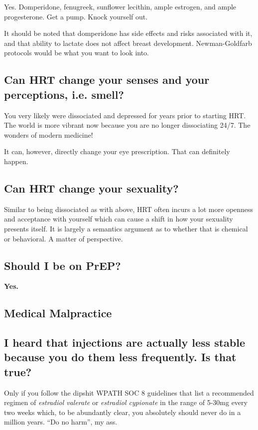 \documentclass{article}
\begin{document}
Yes. Domperidone, fenugreek, sunflower lecithin, ample estrogen, and ample progesterone. Get a pump. Knock yourself out.

It should be noted that domperidone has side effects and risks associated with it, and that ability to lactate does not affect breast development. Newman-Goldfarb protocols would be what you want to look into.

\subsection{Can HRT change your senses and your perceptions, i.e. smell?}

You very likely were dissociated and depressed for years prior to starting HRT. The world is more vibrant now because you are no longer dissociating 24/7. The wonders of modern medicine!

It can, however, directly change your eye prescription. That can definitely happen.

\subsection{Can HRT change your sexuality?}

Similar to being dissociated as with above, HRT often incurs a lot more openness and acceptance with yourself which can cause a shift in how your sexuality presents itself. It is largely a semantics argument as to whether that is chemical or behavioral. A matter of perspective. 

\subsection{Should I be on PrEP?}

\textbf{Yes.}

\subsection*{Medical Malpractice}

\subsection{I heard that injections are actually less stable because you do them less frequently. Is that true?}

Only if you follow the dipshit WPATH SOC 8 guidelines that list a recommended regimen of \textit{estradiol valerate} or \textit{estradiol cypionate} in the range of 5-30mg every two weeks which, to be abundantly clear, you absolutely should never do in a million years. “Do no harm”, my ass. 
\end{document}
